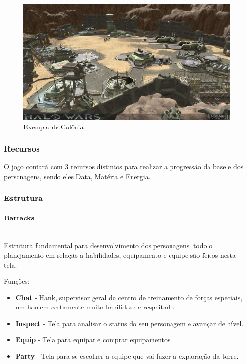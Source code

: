 \documentclass[11pt]{article} %
\begin{document}
\begin{figure}[!htp]
\centering
\includegraphics[scale=0.3]{res/base_building.png}
\caption{Exemplo de Colônia}
\label{Exemplo de Base Building}
\end{figure}

\subsubsection{Recursos}

O jogo contará com 3 recursos distintos para realizar a progressão da base e dos personagens, sendo eles Data, Matéria e Energia.

\subsubsection{Estrutura}

\paragraph{Barracks} \mbox{}\\
Estrutura fundamental para desenvolvimento dos personagens, todo o planejamento em relação a habilidades, equipamento e equipe são feitos nesta tela.

Funções:
\begin{itemize}
  \item \textbf{Chat} - Hank,  supervisor geral do centro de treinamento de forças especiais, um homem certamente muito habilidoso e respeitado.
  \item \textbf{Inspect} - Tela para analisar o status do seu personagem e avançar de nível.
  \item \textbf{Equip} - Tela para equipar e comprar equipamentos.
  \item \textbf{Party} - Tela para se escolher a equipe que vai fazer a exploração da torre.
\end{itemize}
\end{document}
